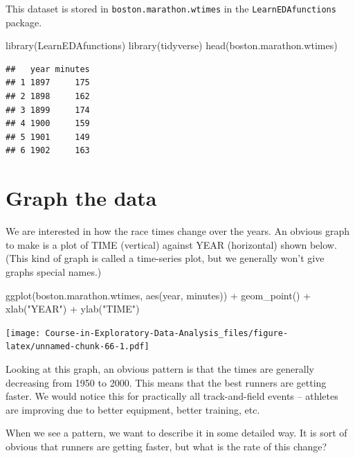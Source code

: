 \documentclass[
]{book}
\newenvironment{Shaded}{\begin{snugshade}}{\end{snugshade}}
\newcommand{\FunctionTok}[1]{\textcolor[rgb]{0.00,0.00,0.00}{#1}}
\newcommand{\NormalTok}[1]{#1}
\newcommand{\SpecialCharTok}[1]{\textcolor[rgb]{0.00,0.00,0.00}{#1}}
\newcommand{\StringTok}[1]{\textcolor[rgb]{0.31,0.60,0.02}{#1}}
\begin{document}
This dataset is stored in \texttt{boston.marathon.wtimes} in the \texttt{LearnEDAfunctions} package.

\begin{Shaded}
\begin{Highlighting}[]
\FunctionTok{library}\NormalTok{(LearnEDAfunctions)}
\FunctionTok{library}\NormalTok{(tidyverse)}
\FunctionTok{head}\NormalTok{(boston.marathon.wtimes)}
\end{Highlighting}
\end{Shaded}

\begin{verbatim}
##   year minutes
## 1 1897     175
## 2 1898     162
## 3 1899     174
## 4 1900     159
## 5 1901     149
## 6 1902     163
\end{verbatim}

\hypertarget{graph-the-data}{%
\section{Graph the data}\label{graph-the-data}}

We are interested in how the race times change over the years. An obvious graph to make is a plot of TIME (vertical) against YEAR (horizontal) shown below. (This kind of graph is called a time-series plot, but we generally won't give graphs special names.)

\begin{Shaded}
\begin{Highlighting}[]
\FunctionTok{ggplot}\NormalTok{(boston.marathon.wtimes,}
       \FunctionTok{aes}\NormalTok{(year, minutes)) }\SpecialCharTok{+}
  \FunctionTok{geom\_point}\NormalTok{() }\SpecialCharTok{+}
  \FunctionTok{xlab}\NormalTok{(}\StringTok{"YEAR"}\NormalTok{) }\SpecialCharTok{+} \FunctionTok{ylab}\NormalTok{(}\StringTok{"TIME"}\NormalTok{)}
\end{Highlighting}
\end{Shaded}

\texttt{[image: Course-in-Exploratory-Data-Analysis\_files/figure-latex/unnamed-chunk-66-1.pdf]}

Looking at this graph, an obvious pattern is that the times are generally decreasing from 1950 to 2000. This means that the best runners are getting faster. We would notice this for practically all track-and-field events -- athletes are improving due to better equipment, better training, etc.

When we see a pattern, we want to describe it in some detailed way. It is sort of obvious that runners are getting faster, but what is the rate of this change?
\end{document}

